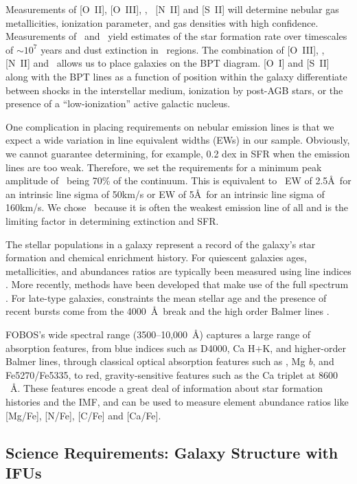 \documentclass[11pt,a4paper,twoside,onecolumn,openany,final,oldfontcommands]{memoir}
\begin{document}
Measurements of [O~II], [O~III], \Halpha, \Hbeta\, [N~II] and [S~II] will determine nebular gas metallicities, ionization parameter, and gas densities with high confidence. Measurements of \Halpha\ and \Hbeta\ yield estimates of the star formation rate over timescales of $\sim$$10^7$ years and dust extinction in \HII\ regions.  The combination of [O~III], \Hbeta, [N~II] and \Halpha\ allows us to place galaxies on the BPT diagram. [O~I] and [S~II] along with the BPT lines as a function of position within the galaxy differentiate between shocks in the interstellar medium, ionization by post-AGB stars, or the presence of a ``low-ionization'' active galactic nucleus.

One complication in placing requirements on nebular emission lines is that we expect a wide variation in line equivalent widths (EWs) in our sample. Obviously, we cannot guarantee determining, for example, 0.2 dex in SFR when the emission lines are too weak. Therefore, we set the requirements for a minimum peak amplitude of \Hbeta\ being 70\% of the continuum. This is equivalent to \Hbeta\ EW of 2.5\AA\ for an intrinsic line sigma of 50km/s or EW of 5\AA\ for an intrinsic line sigma of 160km/s. We chose \Hbeta\ because it is often the weakest emission line of all and is the limiting factor in determining extinction and SFR.

The stellar populations in a galaxy represent a record of the galaxy's star formation and chemical enrichment history.   For quiescent galaxies ages, metallicities, and abundances ratios are typically been measured using line indices \citep[e.g.][]{johansson12}.  More recently, methods have been developed that make use of the full spectrum \citep{conroy14}.  For late-type galaxies, constraints the mean stellar age and the presence of recent bursts come from the 4000~\AA\ break and the high order Balmer lines \citep[e.g.][]{kauffmann03a}. 

FOBOS's wide spectral range (3500--10,000~\AA) captures a large range of absorption features, from blue indices such as D4000, Ca H$+$K, and higher-order Balmer lines, through classical optical absorption features such as \Hbeta, Mg\textit{ b}, and Fe5270/Fe5335, to red, gravity-sensitive features such as the Ca triplet at $8600$~\AA. These features encode a great deal of information about star formation histories and the IMF, and can be used to measure element abundance ratios like [Mg/Fe], [N/Fe], [C/Fe] and [Ca/Fe].

\subsection{Science Requirements: Galaxy Structure with IFUs}
\end{document}

